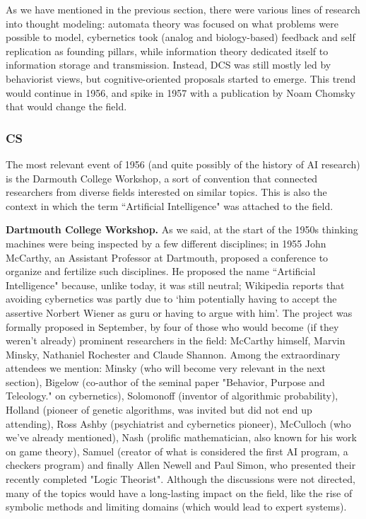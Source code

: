 \documentclass[../main.tex]{subfiles}
\begin{document}
As we have mentioned in the previous section, there were various lines of research into thought modeling: automata theory was focused on what problems were possible to model, cybernetics took (analog and biology-based) feedback and self replication as founding pillars, while information theory dedicated itself to information storage and transmission. Instead, DCS was still mostly led by behaviorist views, but cognitive-oriented proposals started to emerge. This trend would continue in 1956, and spike in 1957 with a publication by Noam Chomsky that would change the field.

\subsubsection{CS}
The most relevant event of 1956 (and quite possibly of the history of AI research) is the Darmouth College Workshop, a sort of convention that connected researchers from diverse fields interested on similar topics. This is also the context in which the term ``Artificial Intelligence" was attached to the field.

\vspace{4pt}
\textbf{Dartmouth College Workshop.}
As we said, at the start of the 1950s thinking machines were being inspected by a few different disciplines; in 1955 John McCarthy, an Assistant Professor at Dartmouth, proposed a conference to organize and fertilize such disciplines. He proposed the name ``Artificial Intelligence" because, unlike today, it was still neutral; Wikipedia reports that avoiding cybernetics was partly due to \enquote*{him potentially having to accept the assertive Norbert Wiener as guru or having to argue with him}. The project was formally proposed in September, by four of those who would become (if they weren't already) prominent researchers in the field: McCarthy himself, Marvin Minsky, Nathaniel Rochester and Claude Shannon. Among the extraordinary attendees we mention: Minsky (who will become very relevant in the next section), Bigelow (co-author of the seminal paper "Behavior, Purpose and Teleology." on cybernetics), Solomonoff (inventor of algorithmic probability), Holland (pioneer of genetic algorithms, was invited but did not end up attending), Ross Ashby (psychiatrist and cybernetics pioneer), McCulloch (who we've already mentioned), Nash (prolific mathematician, also known for his work on game theory), Samuel (creator of what is considered the first AI program, a checkers program) and finally Allen Newell and Paul Simon, who presented their recently completed "Logic Theorist". Although the discussions were not directed, many of the topics would have a long-lasting impact on the field, like the rise of symbolic methods and limiting domains (which would lead to expert systems).
\end{document}
